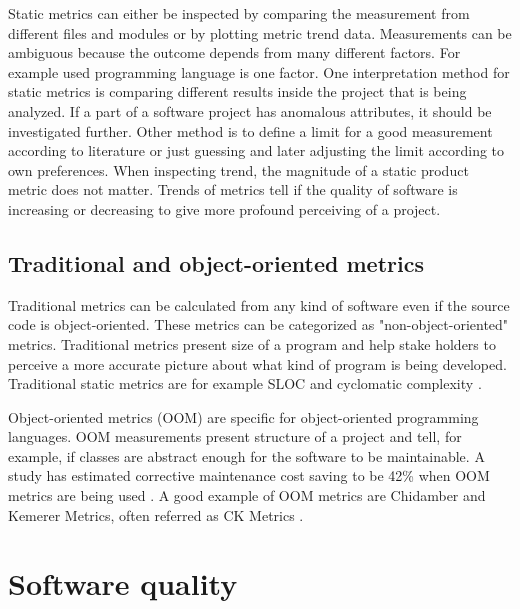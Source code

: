 Static metrics can either be inspected by comparing the measurement from different files and modules or by plotting metric trend data. Measurements can be ambiguous because the outcome depends from many different factors. For example used programming language is one factor. One interpretation method for static metrics is comparing different results inside the project that is being analyzed. If a part of a software project has anomalous attributes, it should be investigated further. Other method is to define a limit for a good measurement according to literature or just guessing and later adjusting the limit according to own preferences.
When inspecting trend, the magnitude of a static product metric does not matter. Trends of metrics tell if the quality of software is increasing or decreasing to give more profound perceiving of a project.

\subsection{Traditional and object-oriented metrics}

Traditional metrics can be calculated from any kind of software even if the source code is object-oriented. These metrics can be categorized as "non-object-oriented" metrics. Traditional metrics present size of a program and help stake holders to perceive a more accurate picture about what kind of program is being developed. Traditional static metrics are for example SLOC and cyclomatic complexity \cite{fenton1997software}.  

Object-oriented metrics (OOM) are specific for object-oriented programming languages. OOM measurements present structure of a project and tell, for example, if classes are abstract enough for the software to be maintainable. A study has estimated corrective maintenance cost saving to be 42\% when OOM metrics are being used \cite{sarker2005overview}. A good example of OOM metrics are Chidamber and Kemerer Metrics, often referred as CK Metrics \cite{chidamber1994metrics}.

\section{Software quality}
\label{chap:quality}

